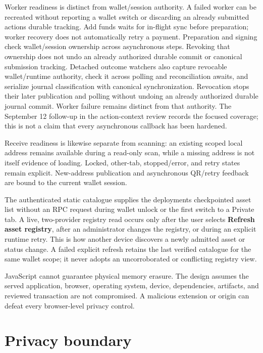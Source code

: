 \documentclass[11pt,letterpaper]{article}
\begin{document}
Worker readiness is distinct from wallet/\allowbreak{}session authority.
A failed worker can be recreated without reporting a wallet switch or
discarding an already submitted action\textquotesingle s durable
tracking. Add funds waits for in-flight sync before preparation; worker
recovery does not automatically retry a payment. Preparation and signing
check wallet/\allowbreak{}session ownership across asynchronous steps.
Revoking that ownership does not undo an already authorized durable
commit or canonical submission tracking. Detached outcome watchers also
capture revocable wallet/\allowbreak{}runtime authority, check it across
polling and reconciliation awaits, and serialize journal classification
with canonical synchronization. Revocation stops their later publication
and polling without undoing an already authorized durable journal
commit. Worker failure remains distinct from that authority. The
September 12 follow-up in the action-context review records the focused
coverage; this is not a claim that every asynchronous callback has been
hardened.

Receive readiness is likewise separate from scanning: an existing scoped
local address remains available during a read-only scan, while a missing
address is not itself evidence of loading. Locked, other-tab,
stopped/\allowbreak{}error, and retry states remain explicit.
New-address publication and asynchronous QR/\allowbreak{}retry feedback
are bound to the current wallet session.

The authenticated static catalogue supplies the
deployment\textquotesingle s checkpointed asset list without an RPC
request during wallet unlock or the first switch to a Private tab. A
live, two-provider registry read occurs only after the user selects
\textbf{Refresh asset registry}, after an administrator changes the
registry, or during an explicit runtime retry. This is how another
device discovers a newly admitted asset or status change. A failed
explicit refresh retains the last verified catalogue for the same wallet
scope; it never adopts an uncorroborated or conflicting registry view.

JavaScript cannot guarantee physical memory erasure. The design assumes
the served application, browser, operating system, device, dependencies,
artifacts, and reviewed transaction are not compromised. A malicious
extension or origin can defeat every browser-level privacy control.

\section{Privacy boundary}\label{privacy-boundary}
\end{document}

